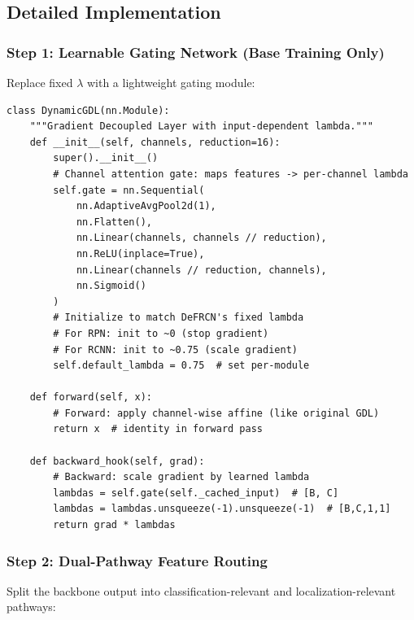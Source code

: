 \documentclass[11pt,a4paper]{article}
\begin{document}
\subsection{Detailed Implementation}

\subsubsection{Step 1: Learnable Gating Network (Base Training Only)}

Replace fixed $\lambda$ with a lightweight gating module:

\begin{lstlisting}[caption={Dynamic GDL with learned gating}]
class DynamicGDL(nn.Module):
    """Gradient Decoupled Layer with input-dependent lambda."""
    def __init__(self, channels, reduction=16):
        super().__init__()
        # Channel attention gate: maps features -> per-channel lambda
        self.gate = nn.Sequential(
            nn.AdaptiveAvgPool2d(1),
            nn.Flatten(),
            nn.Linear(channels, channels // reduction),
            nn.ReLU(inplace=True),
            nn.Linear(channels // reduction, channels),
            nn.Sigmoid()
        )
        # Initialize to match DeFRCN's fixed lambda
        # For RPN: init to ~0 (stop gradient)
        # For RCNN: init to ~0.75 (scale gradient)
        self.default_lambda = 0.75  # set per-module

    def forward(self, x):
        # Forward: apply channel-wise affine (like original GDL)
        return x  # identity in forward pass

    def backward_hook(self, grad):
        # Backward: scale gradient by learned lambda
        lambdas = self.gate(self._cached_input)  # [B, C]
        lambdas = lambdas.unsqueeze(-1).unsqueeze(-1)  # [B,C,1,1]
        return grad * lambdas
\end{lstlisting}

\subsubsection{Step 2: Dual-Pathway Feature Routing}

Split the backbone output into classification-relevant and localization-relevant pathways:
\end{document}
